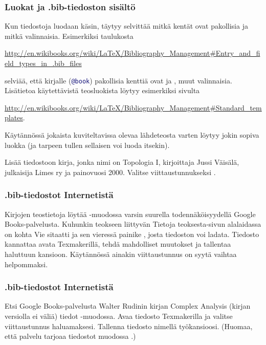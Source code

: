 \begin{fframe}
    \frametitle{Luokat ja .bib-tiedoston sisältö}
    Kun tiedostoja luodaan käsin, täytyy selvittää mitkä kentät ovat pakollisia ja mitkä valinnaisia. 
    \vaihto
    Esimerkiksi taulukosta 
    \begin{scriptsize}
        \url{http://en.wikibooks.org/wiki/LaTeX/Bibliography_Management#Entry_and_field_types_in_.bib_files}
    \end{scriptsize}
    selviää, että kirjalle (\lstinline[language=BibTeX]-@book-) pakollisia kenttiä ovat  ja , muut valinnaisia.
    \vaihto
    Lisätietoa käytettävistä teosluokista löytyy esimerkiksi sivulta
    \begin{scriptsize}
        \url{http://en.wikibooks.org/wiki/LaTeX/Bibliography_Management#Standard_templates}.
    \end{scriptsize}
    \vaihto
    Käytännössä jokaista kuviteltavissa olevaa lähdeteosta varten löytyy jokin sopiva luokka (ja tarpeen tullen sellaisen voi luoda itsekin).
\end{fframe}

\begin{fframe}
    \begin{harj}
        Lisää tiedostoon  kirja, jonka nimi on Topologia I, kirjoittaja Jussi Väisälä, julkaisija Limes ry ja painovuosi 2000. Valitse viittaustunnukseksi .
    \end{harj}
\end{fframe}

\begin{fframe}
    \frametitle{.bib-tiedostot Internetistä}
    Kirjojen teostietoja löytää \BibTeX -muodossa varsin suurella todennäköisyydellä Google Books-palvelusta. 
    \vaihto
    Kuhunkin teokseen liittyvän Tietoja teoksesta-sivun alalaidassa on kohta Vie sitaatti ja sen vieressä painike \BibTeX, josta tiedoston voi ladata.
    \vaihto
    Tiedosto kannattaa avata Texmakerillä, tehdä mahdolliset muutokset ja tallentaa haluttuun kansioon. 
    \vaihto
    Käytännössä ainakin viittaustunnus on syytä vaihtaa helpommaksi.
\end{fframe}

\begin{fframe}
    \frametitle{.bib-tiedostot Internetistä}
    \begin{harj}
        Etsi Google Books-palvelusta Walter Rudinin kirjan Complex Analysis (kirjan versiolla ei väliä) tiedot \BibTeX -muodossa. Avaa tiedosto Texmakerilla ja valitse viittaustunnus haluamaksesi. Tallenna tiedosto nimellä  työkansioosi. (Huomaa, että palvelu tarjoaa tiedostot muodossa .)
    \end{harj}
\end{fframe}

